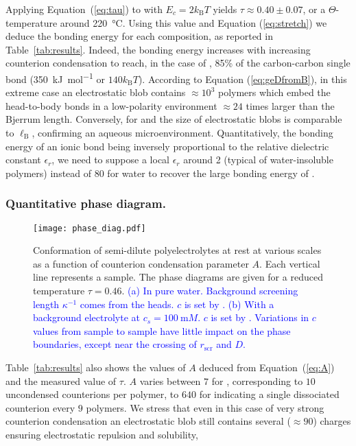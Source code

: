 \documentclass[twoside,twocolumn,9pt]{article}
\begin{document}
Applying Equation~(\ref{eq:tau}) to  with $E_c = 2 k_\mathrm{B}T$ yields $\tau \approx 0.40\pm 0.07$, or a $\Theta$-temperature around \SI{220}{\celsius}. Using this value and Equation (\ref{eq:stretch}) we deduce the bonding energy for each composition, as reported in Table~\ref{tab:results}. Indeed, the bonding energy increases with increasing counterion condensation to reach, in the case of , 85\% of the carbon-carbon single bond (\SI{350}{\kilo\joule\per\mole} or $140 k_\mathrm{B}T$). According to Equation (\ref{eq:geDfromB}), in this extreme case an electrostatic blob contains $\approx 10^3$ polymers which embed the head-to-body bonds in a low-polarity environment $\approx 24$ times larger than the Bjerrum length. Conversely, for  and  the size of electrostatic blobs is comparable to $\ell_\mathrm{B}$, confirming an aqueous microenvironment. Quantitatively, the bonding energy of an ionic bond being inversely proportional to the relative dielectric constant $\epsilon_r$, we need to suppose a local $\epsilon_r$ around 2 (typical of water-insoluble polymers) instead of 80 for water to recover the large bonding energy of .

\subsubsection{Quantitative phase diagram.}

\begin{figure}
\texttt{[image: phase\_diag.pdf]}
\caption{Conformation of semi-dilute polyelectrolytes at rest at various scales as a function of counterion condensation parameter $A$. Each vertical line represents a sample. The phase diagrams are given for a reduced temperature $\tau=0.46$. \textcolor{blue}{(a) In pure water. Background screening length $\kappa^{-1}$ comes from the  heads.  $c$ is set by . (b) With a background electrolyte at $c_s=\SI{100}{\milli M}$. $c$ is set by . Variations in $c$ values from sample to sample have little impact on the phase boundaries, except near the crossing of $r_\mathrm{scr}$ and $D$.}}
\label{fig:phasediag}
\end{figure}

Table~\ref{tab:results} also shows the values of $A$ deduced from Equation~(\ref{eq:A}) and the measured value of $\tau$. $A$ varies between $7$ for , corresponding to $10$ uncondensed counterions per polymer, to $640$ for  indicating a single dissociated counterion every $9$ polymers. We stress that even in this case of very strong counterion condensation an electrostatic blob still contains several ($\approx 90$) charges ensuring electrostatic repulsion and solubility,
\end{document}

